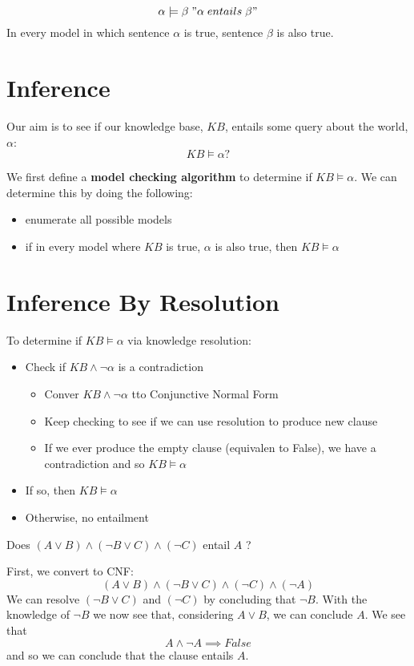 \begin{definition}[Enatilment]
	\[
		\alpha \models \beta \; "\alpha \; entails \; \beta"
	\]
	In every model in which sentence \(\alpha \) is true, sentence \(\beta \) is also true.
\end{definition}

\section{Inference}
Our aim is to see if our knowledge base, \(KB\), entails some query about the world, \(\alpha\):
\[
	KB \models \alpha ?
\]  

We first define a \textbf{model checking algorithm} to determine if \(KB \models \alpha \). We can determine this by doing the following:
\begin{itemize}
	\item enumerate all possible models
	\item if in every model where \(KB\) is true, \(\alpha \) is also true, then \(KB \models \alpha \) 
\end{itemize}

\section{Inference By Resolution}
To determine if \(KB \models \alpha \) via knowledge resolution:
\begin{itemize}
	\item Check if \(KB \land \neg \alpha \) is a contradiction
	\begin{itemize}
		\item Conver \(KB \land \neg \alpha \) tto Conjunctive Normal Form
		\item Keep checking to see if we can use resolution to produce new clause
		\item If we ever produce the empty clause (equivalen to False), we have a contradiction and so \(KB \models \alpha \)
	\end{itemize}
	\item If so, then \(KB \models \alpha \)
	\item Otherwise, no entailment
\end{itemize}

\begin{problem}
	Does \((A \vee B) \land (\neg B \vee C) \land (\neg C)\) entail \(A\) ?
\end{problem}
\begin{answer}
	First, we convert to CNF:
	\[
		(A \vee B) \land (\neg B \vee C) \land (\neg C) \land (\neg A)
	\]
	We can resolve \((\neg B \vee C)\) and \((\neg C)\) by concluding that \(\neg B\). With the knowledge of \(\neg B\) we now see that, considering \(A \vee B\), we can conclude \(A\). We see that
	\[
		A \land \neg A \implies False
	\]
	and so we can conclude that the clause entails \(A\).
\end{answer} 